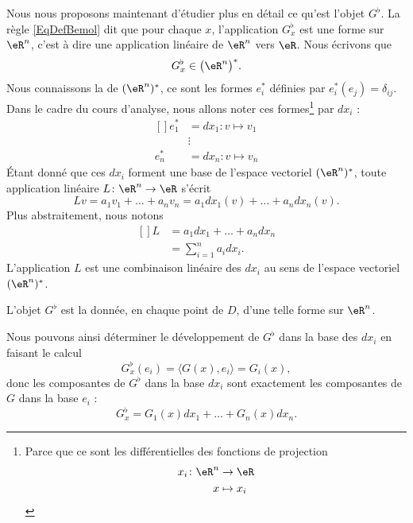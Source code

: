 Nous nous proposons maintenant d'étudier plus en détail ce qu'est l'objet $G^{\flat}$. La règle \eqref{EqDefBemol} dit que pour chaque $x$, l'application $G_x^{\flat}$ est une forme sur $\eR^n$, c'est à dire une application linéaire de $\eR^n$ vers $\eR$. Nous écrivons que
\begin{equation}
	G_x^{\flat}\in\big( \eR^n \big)^*.
\end{equation}
Nous connaissons la  de $(\eR^n)^*$, ce sont les formes $e^*_i$ définies par $e^*_i(e_j)=\delta_{ij}$. Dans le cadre du cours d'analyse, nous allons noter ces formes\footnote{Parce que ce sont les différentielles des fonctions de projection
\begin{equation}
	\begin{aligned}
			x_i\colon \eR^n&\to \eR \\
			x&\mapsto x_i 
		\end{aligned}
	\end{equation}
}
par $dx_i$ :
\begin{equation}
	\begin{aligned}[]
		e^*_1&=dx_1\colon v\mapsto v_1	\\
			&\vdots			\\
		e^*_n&=dx_n\colon v\mapsto v_n
	\end{aligned}
\end{equation}
Étant donné que ces $dx_i$ forment une base de l'espace vectoriel $(\eR^n)^*$, toute application linéaire $L\colon \eR^n\to \eR$ s'écrit
\begin{equation}
		Lv=a_1v_1+\ldots+a_nv_n =a_1dx_1(v)+\ldots+a_ndx_n(v).
\end{equation}
Plus abstraitement, nous notons
\begin{equation}
	\begin{aligned}[]
		L&=a_1dx_1+\ldots+a_ndx_n\\
		&=\sum_{i=1}^na_idx_i.
	\end{aligned}
\end{equation}
L'application $L$ est une combinaison linéaire des $dx_i$ au sens de l'espace vectoriel $(\eR^n)^*$.

L'objet $G^{\flat}$ est la donnée, en chaque point de $D$, d'une telle forme sur $\eR^n$. 

Nous pouvons ainsi déterminer le développement de $G^{\flat}$ dans la base des $dx_i$ en faisant le calcul
\begin{equation}
	G_x^{\flat}(e_i)=\langle G(x), e_i\rangle =G_i(x),
\end{equation}
donc les composantes de $G^{\flat}$ dans la base $dx_i$ sont exactement les composantes de $G$ dans la base $e_i$ :
\begin{equation}
	G^{\flat}_x=G_1(x)dx_1+\ldots+G_n(x)dx_n.
\end{equation}

